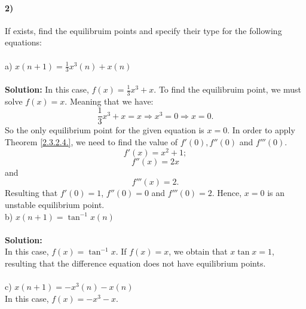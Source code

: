 \documentclass[a4paper,11pt]{report}
\begin{document}
\paragraph{2)} If exists, find the equilibruim points and specify their type for the following equations:\\ \\
a) $x(n+1)=\frac{1}{3}x^{3}(n)+x(n)$\\ \\
\textbf{Solution:}
In this case, $f(x)=\frac{1}{3}x^{3}+x$. To find the equilibruim point, we must solve $f(x)=x$. Meaning that we have:
$$\frac{1}{3} x^{3}+x=x \Rightarrow x^{3}=0 \Rightarrow x=0.$$
So the only equilibrium point for the given equation is $x=0$. In order to apply Theorem \ref{2.3.2.4.}, we need to find the value of $f'(0), f''(0)$ and $f'''(0).$ 
$$f'(x)=x^{2}+1;$$
$$f''(x)=2x$$ and
$$f'''(x)=2.$$
Resulting that $f'(0)=1$, $f''(0)=0$ and $f'''(0)=2$. Hence, $x=0$ is an unstable equilibrium point.\\

b) $x(n+1)=\tan^{-1}{x(n)}$ \\ \\
\textbf{Solution:}\\

In this case, $f(x)=\tan^{-1}{x}$. If $f(x)=x$, we obtain that $x\tan{x}=1$, resulting that the difference equation does not have equilibrium points. \\ \\
c) $x(n+1)=-x^{3}(n)-x(n)$\\

In this case, $f(x)=-x^{3}-x$. 
\end{document}
